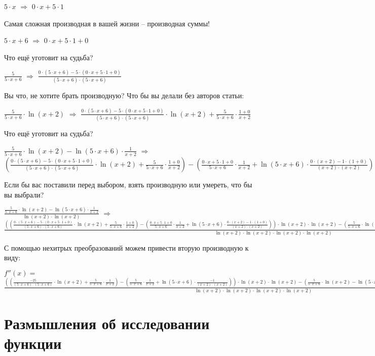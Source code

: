 \documentclass{article}
\begin{document}
$5 \cdot x$ $\Rightarrow$ $0 \cdot x + 5 \cdot 1$

Самая сложная производная в вашей жизни -- производная суммы!

$5 \cdot x + 6$ $\Rightarrow$ $0 \cdot x + 5 \cdot 1 + 0$

Что ещё уготовит на судьба?

$\frac{5}{5 \cdot x + 6}$ $\Rightarrow$ $\frac{0 \cdot (5 \cdot x + 6) - 5 \cdot (0 \cdot x + 5 \cdot 1 + 0)}{(5 \cdot x + 6) \cdot (5 \cdot x + 6)}$

Вы что, не хотите брать производную? Что бы вы делали без авторов статьи:

$\frac{5}{5 \cdot x + 6} \cdot  \ln (x + 2)$ $\Rightarrow$ $\frac{0 \cdot (5 \cdot x + 6) - 5 \cdot (0 \cdot x + 5 \cdot 1 + 0)}{(5 \cdot x + 6) \cdot (5 \cdot x + 6)} \cdot  \ln (x + 2) + \frac{5}{5 \cdot x + 6} \cdot \frac{1 + 0}{x + 2}$

Что ещё уготовит на судьба?

$\frac{5}{5 \cdot x + 6} \cdot  \ln (x + 2) -  \ln (5 \cdot x + 6) \cdot \frac{1}{x + 2}$ $\Rightarrow$ $(\frac{0 \cdot (5 \cdot x + 6) - 5 \cdot (0 \cdot x + 5 \cdot 1 + 0)}{(5 \cdot x + 6) \cdot (5 \cdot x + 6)} \cdot  \ln (x + 2) + \frac{5}{5 \cdot x + 6} \cdot \frac{1 + 0}{x + 2}) - (\frac{0 \cdot x + 5 \cdot 1 + 0}{5 \cdot x + 6} \cdot \frac{1}{x + 2} +  \ln (5 \cdot x + 6) \cdot \frac{0 \cdot (x + 2) - 1 \cdot (1 + 0)}{(x + 2) \cdot (x + 2)})$

Если бы вас поставили перед выбором, взять производную или умереть, что бы вы выбрали?

$\frac{\frac{5}{5 \cdot x + 6} \cdot  \ln (x + 2) -  \ln (5 \cdot x + 6) \cdot \frac{1}{x + 2}}{ \ln (x + 2) \cdot  \ln (x + 2)}$ $\Rightarrow$ $\frac{((\frac{0 \cdot (5 \cdot x + 6) - 5 \cdot (0 \cdot x + 5 \cdot 1 + 0)}{(5 \cdot x + 6) \cdot (5 \cdot x + 6)} \cdot  \ln (x + 2) + \frac{5}{5 \cdot x + 6} \cdot \frac{1 + 0}{x + 2}) - (\frac{0 \cdot x + 5 \cdot 1 + 0}{5 \cdot x + 6} \cdot \frac{1}{x + 2} +  \ln (5 \cdot x + 6) \cdot \frac{0 \cdot (x + 2) - 1 \cdot (1 + 0)}{(x + 2) \cdot (x + 2)})) \cdot  \ln (x + 2) \cdot  \ln (x + 2) - (\frac{5}{5 \cdot x + 6} \cdot  \ln (x + 2) -  \ln (5 \cdot x + 6) \cdot \frac{1}{x + 2}) \cdot (\frac{1 + 0}{x + 2} \cdot  \ln (x + 2) +  \ln (x + 2) \cdot \frac{1 + 0}{x + 2})}{ \ln (x + 2) \cdot  \ln (x + 2) \cdot  \ln (x + 2) \cdot  \ln (x + 2)}$

С помощью нехитрых преобразований можем привести вторую производную к виду:

$f''(x) = $ $\frac{((\frac{-25}{(5 \cdot x + 6) \cdot (5 \cdot x + 6)} \cdot  \ln (x + 2) + \frac{5}{5 \cdot x + 6} \cdot \frac{1}{x + 2}) - (\frac{5}{5 \cdot x + 6} \cdot \frac{1}{x + 2} +  \ln (5 \cdot x + 6) \cdot \frac{-1}{(x + 2) \cdot (x + 2)})) \cdot  \ln (x + 2) \cdot  \ln (x + 2) - (\frac{5}{5 \cdot x + 6} \cdot  \ln (x + 2) -  \ln (5 \cdot x + 6) \cdot \frac{1}{x + 2}) \cdot (\frac{1}{x + 2} \cdot  \ln (x + 2) +  \ln (x + 2) \cdot \frac{1}{x + 2})}{ \ln (x + 2) \cdot  \ln (x + 2) \cdot  \ln (x + 2) \cdot  \ln (x + 2)}$\section{Размышления об исследовании функции}
\end{document}
